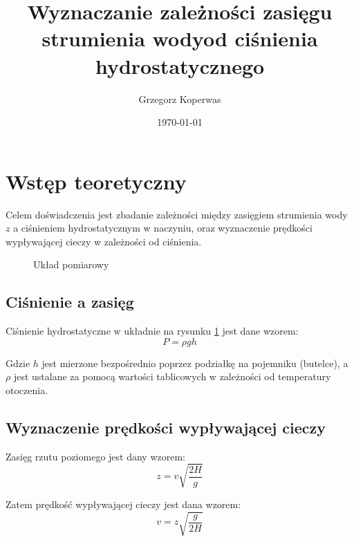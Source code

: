 \documentclass[a4paper,12pt]{article}
\title{Wyznaczanie zależności zasięgu strumienia wodyod ciśnienia hydrostatycznego}
\author{Grzegorz Koperwas}
\date{\today}
\begin{document}


\section{Wstęp teoretyczny}

Celem doświadczenia jest zbadanie zależności między zasięgiem strumienia wody $z$ a ciśnieniem hydrostatycznym w naczyniu, oraz wyznaczenie prędkości wypływającej cieczy w zależności od ciśnienia.

\begin{figure}[h]
	\centering
	\caption{Układ pomiarowy}\label{rys:układ}
\end{figure}

\subsection*{Ciśnienie a zasięg}

Ciśnienie hydrostatyczne w układnie na rysunku \ref{rys:układ} jest dane wzorem:
\[ P = \rho g h\]

Gdzie $h$ jest mierzone bezpośrednio poprzez podziałkę na pojemniku (butelce), a $\rho$ jest ustalane za pomocą wartości tablicowych w zależności od temperatury otoczenia.

\subsection*{Wyznaczenie prędkości wypływającej cieczy}

Zasięg rzutu poziomego jest dany wzorem:
\[z = v \sqrt{\frac{2 H}{g}}\]

Zatem prędkość wypływającej cieczy jest dana wzorem:
\begin{equation}
v = z \sqrt{\frac{g}{2 H}}\label{eq:rzut}
\end{equation}
\end{document}
